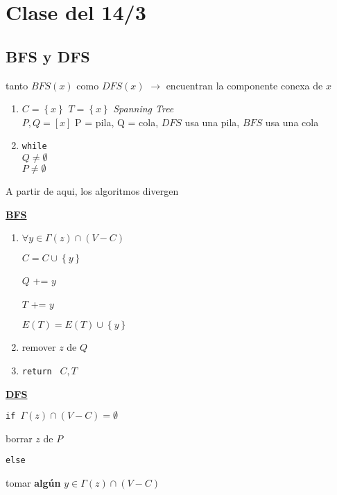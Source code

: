 \documentclass[12pt]{article}
\begin{document}
\newpage

\section*{Clase del 14/3}
\subsection*{BFS y DFS}

tanto $BFS(x)$ como $DFS(x)$ $\rightarrow$ encuentran la componente conexa de $x$

\begin{enumerate}
\item $C = \left\{x\right\}$
$T = \left\{x\right\}$ \hspace{1em} \textit{Spanning Tree} \\
$P, Q = [x]$ \hspace{1em} P = pila, Q = cola, $DFS$ usa una pila, $BFS$ usa una cola

\item 
\texttt{while} \\
\hspace{2em} $Q \neq \emptyset$ \\
\hspace{2em} $P \neq \emptyset$
\end{enumerate}

A partir de aqui, los algoritmos divergen \bigskip

\underline{\textbf{BFS}}

\begin{enumerate}
\item$\forall y \in \Gamma(z) \cap (V -C)$

$C = C \cup \left\{y\right\}$

$Q$ += $y$

$T$ += $y $

$E(T) = E(T) \cup \left\{y\right\}$

\item remover $z$ de $Q$

\item\texttt{return } $C, T$
\end{enumerate}

\underline{\textbf{DFS}}

\texttt{if \(\Gamma(z) \cap (V - C) = \emptyset\)}

\hspace{1em} borrar $z$ de $P$

\texttt{else }

\hspace{1em}tomar \textbf{algún} $y \in \Gamma(z) \cap (V-C)$ 
\end{document}
